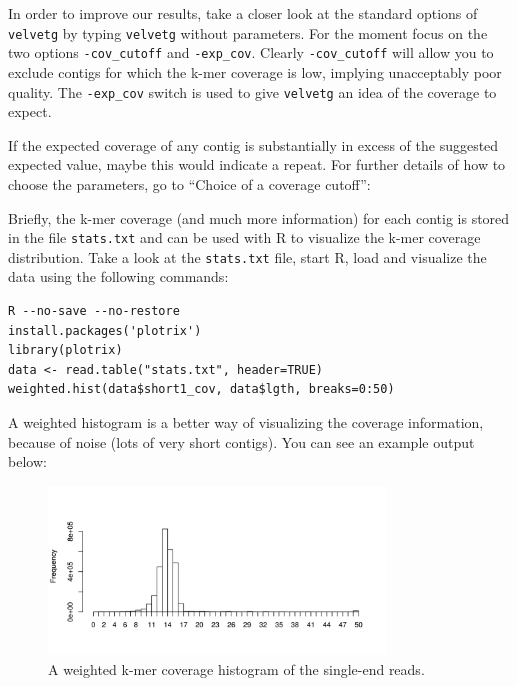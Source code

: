 \begin{information}
In order to improve our results, take a closer look at the standard options of
\texttt{velvetg} by typing \texttt{velvetg} without parameters. For the moment
focus on the two options \texttt{-cov\_cutoff} and \texttt{-exp\_cov}. Clearly
\texttt{-cov\_cutoff} will allow you to exclude contigs for which the k-mer
coverage is low, implying unacceptably poor quality.
The \texttt{-exp\_cov} switch is used to give \texttt{velvetg} an idea of the
coverage to expect.

If the expected coverage of any contig is substantially in excess of the
suggested expected value, maybe this would indicate a repeat. For further
details of how to choose the parameters, go to ``Choice of a coverage cutoff'':


\end{information}

\begin{steps}
Briefly, the k-mer coverage (and much more information) for each contig is stored
in the file \texttt{stats.txt} and can be used with R to visualize the k-mer coverage
distribution. Take a look at the \texttt{stats.txt} file, start R, load and
visualize the data using the following commands:
\begin{lstlisting}[style=R]
R --no-save --no-restore
install.packages('plotrix')
library(plotrix)
data <- read.table("stats.txt", header=TRUE)
weighted.hist(data$short1_cov, data$lgth, breaks=0:50)
\end{lstlisting}

A weighted histogram is a better way of visualizing the coverage information,
because of noise (lots of very short contigs). You can see an example output
below:
\end{steps}

\begin{figure}[H]
\centering
\includegraphics[width=0.8\textwidth]{handout/velvet/velvet_Rplot001.png}
\caption{\label{fig:SRS004748_coverage_hist} A weighted k-mer coverage histogram of the single-end reads.}
\end{figure}

